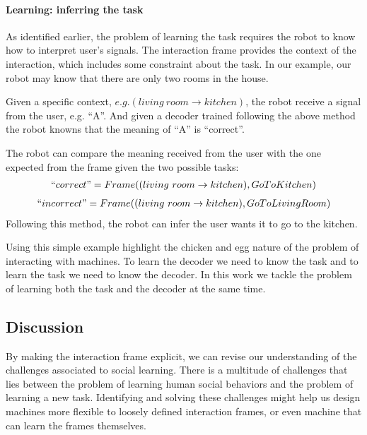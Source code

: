 \paragraph{Learning: inferring the task}

As identified earlier, the problem of learning the task requires the robot to know how to interpret user's signals. The interaction frame provides the context of the interaction, which includes some constraint about the task. In our example, our robot may know that there are only two rooms in the house. 

Given a specific context, $e.g. (living~room \rightarrow kitchen)$, the robot receive a signal from the user, e.g. ``A''. And given a decoder trained following the above method the robot knowns that the meaning of ``A'' is ``correct''.

The robot can compare the meaning received from the user with the one expected from the frame given the two possible tasks:
%
\begin{eqnarray}
``correct" = Frame((living~room \rightarrow kitchen), Go To Kitchen) \nonumber
\end{eqnarray}
\begin{eqnarray}
``incorrect" = Frame((living~room \rightarrow kitchen), Go To Living Room) \nonumber
\end{eqnarray}
%
Following this method, the robot can infer the user wants it to go to the kitchen.

\transition

Using this simple example highlight the chicken and egg nature of the problem of interacting with machines. To learn the decoder we need to know the task and to learn the task we need to know the decoder. In this work we tackle the problem of learning both the task and the decoder at the same time.

\subsection{Discussion}

By making the interaction frame explicit, we can revise our understanding of the challenges associated to social learning. There is a multitude of challenges that lies between the problem of learning human social behaviors and the problem of learning a new task. Identifying and solving these challenges might help us design machines more flexible to loosely defined interaction frames, or even machine that can learn the frames themselves.

